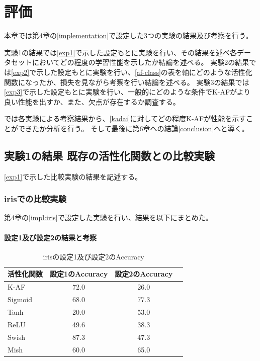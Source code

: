 \chapter{評価}
\label{evaluation}

本章では第4章の\ref{implementation}で設定した3つの実験の結果及び考察を行う。

実験1の結果\label{evo1}では\ref{exp1}で示した設定もとに実験を行い、その結果を述べ各データセットにおいてどの程度の学習性能を示したか結論を述べる。
実験2の結果\label{evo2}では\ref{exp2}で示した設定もとに実験を行い、\ref{af-class}の表を軸にどのような活性化関数になったか、損失を見ながら考察を行い結論を述べる。
実験3の結果\label{evo3}では\ref{exp3}で示した設定もとに実験を行い、一般的にどのような条件でK-AFがより良い性能を出すか、また、欠点が存在するか調査する。

\label{result}では各実験による考察結果から、\ref{kadai}に対してどの程度K-AFが性能を示すことができたか分析を行う。
そして最後に第6章への結論\ref{conclusion}へと導く。


\section{実験1の結果 既存の活性化関数との比較実験}
\label{evo1}
\ref{exp1}で示した比較実験の結果を記述する。

\subsection{irisでの比較実験}
\label{ev:iris}

第4章の\ref{impl:iris}で設定した実験を行い、結果を以下にまとめた。
\subsubsection{設定1及び設定2の結果と考察}


\begin{table}[htbp]
    \begin{center}
        \caption{irisの設定1及び設定2のAccuracy}
        \vspace{2mm} 
        \begin{tabular}{l*{2}{c}r}
            活性化関数  & 設定1のAccuracy &  設定2のAccuracy \\
            \hline
            K-AF            & 72.0 & 26.0 \\
            Sigmoid            & 68.0 & 77.3\\
            Tanh            & 20.0 & 53.0\\
            ReLU        &  49.6 &  38.3\\
            Swish           & 87.3 & 47.3 \\
            Mish           & 60.0 & 65.0 \\
    
        \end{tabular}
    \end{center}
\end{table}


